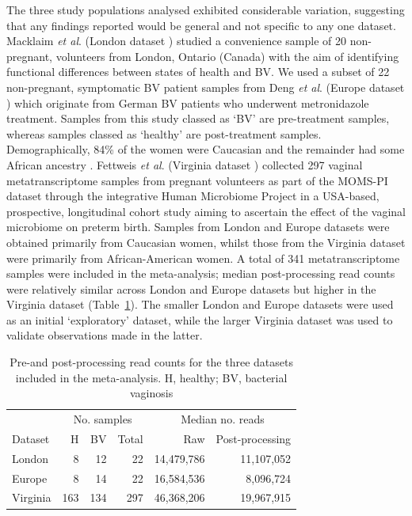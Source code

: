 \documentclass[sn-mathphys,Numbered]{sn-jnl}%
\begin{document}
The three study populations analysed exhibited considerable variation, suggesting that any findings reported would be general and not specific to any one dataset. Macklaim \textit{et al}. (London dataset \cite{Macklaim:2018aa}) studied a convenience sample of 20 non-pregnant, volunteers from London, Ontario (Canada) with the aim of identifying functional differences between states of health and BV. We used a subset of 22 non-pregnant, symptomatic BV patient samples from Deng \textit{et al}. (Europe dataset \cite{Denge00262-18}) which originate from German BV patients who underwent metronidazole treatment. Samples from this study classed as `BV' are pre-treatment samples, whereas samples classed as `healthy' are post-treatment samples. Demographically, 84\% of the women were Caucasian and the remainder had some African ancestry \cite{Gottschick:2017aa}. Fettweis \textit{et al}. (Virginia dataset \cite{Fettweis:2019aa}) collected 297 vaginal metatranscriptome samples from pregnant volunteers as part of the MOMS-PI dataset through the integrative Human Microbiome Project in a USA-based, prospective, longitudinal cohort study aiming to ascertain the effect of the vaginal microbiome on preterm birth. Samples from London and Europe datasets were obtained primarily from Caucasian women, whilst those from the Virginia dataset were primarily from African-American women. A total of 341 metatranscriptome samples were included in the meta-analysis; median post-processing read counts were relatively similar across London and Europe datasets but higher in the Virginia dataset (Table~\ref{tab:tabReadCounts}). The smaller London and Europe datasets were used as an initial `exploratory' dataset, while the larger Virginia dataset was used to validate observations made in the latter.

\begin{table}[h]
    \centering
    \caption{Pre-and post-processing read counts for the three datasets included in the meta-analysis. H, healthy; BV, bacterial vaginosis} \label{tab:tabReadCounts}
    \begin{tabular}{lrrrrr}
        \toprule
        & \multicolumn{3}{c}{No. samples} & \multicolumn{2}{c}{Median no. reads}\\
        \cmidrule(lr){2-4} \cmidrule(lr){5-6}
        Dataset & H & BV & Total & Raw & Post-processing\\
        \midrule
        London \cite{Macklaim:2018aa} & 8 & 12 & 22 & 14,479,786 & 11,107,052\\
        Europe \cite{Denge00262-18} & 8 & 14 & 22 & 16,584,536 & 8,096,724\\
        Virginia \cite{Fettweis:2019aa} & 163 & 134 & 297 & 46,368,206 & 19,967,915\\
        \bottomrule
    \end{tabular}
\end{table}
\end{document}
